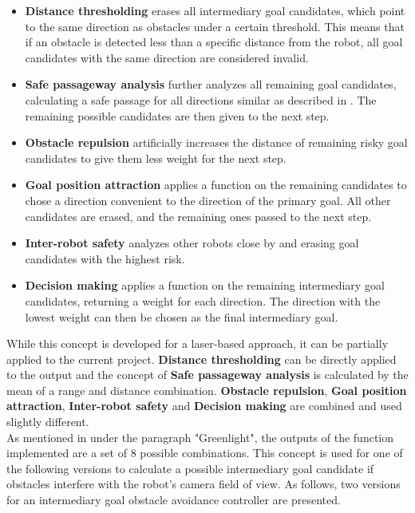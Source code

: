 \begin{itemize}
\item  \textbf{Distance thresholding} erases all intermediary goal candidates, which point to the same direction as obstacles under a certain threshold. This means that if an obstacle is detected less than a specific distance from the robot, all goal candidates with the same direction are considered invalid.
\item  \textbf{Safe passageway analysis} further analyzes all remaining goal candidates, calculating a safe passage for all directions similar as described in . The remaining possible candidates are then given to the next step.
\item  \textbf{Obstacle repulsion} artificially increases the distance of remaining risky goal candidates to give them less weight for the next step.
\item  \textbf{Goal position attraction} applies a function on the remaining candidates to chose a direction convenient to the direction of the primary goal. All other candidates are erased, and the remaining ones passed to the next step.
\item  \textbf{Inter-robot safety} analyzes other robots  close by and erasing goal candidates with the highest risk.
\item  \textbf{Decision making} applies a function on the remaining intermediary goal candidates, returning a weight for each direction. The direction with the lowest weight can then be chosen as the final intermediary goal.
\end{itemize}

While this concept is developed for a laser-based approach, it can be partially applied to the current project. \textbf{Distance thresholding} can be directly applied to the output and the concept of \textbf{Safe passageway analysis} is calculated by the mean of a range and distance combination. \textbf{Obstacle repulsion}, \textbf{Goal position attraction}, \textbf{Inter-robot safety} and \textbf{Decision making} are combined and used slightly different.\\

As mentioned in  under the paragraph "Greenlight", the outputs of the function implemented are a set of 8 possible combinations. This concept is used for one of the following versions to calculate a possible intermediary goal candidate if obstacles interfere with the robot's camera field of view. As follows, two versions for an intermediary goal obstacle avoidance controller are presented.\\


